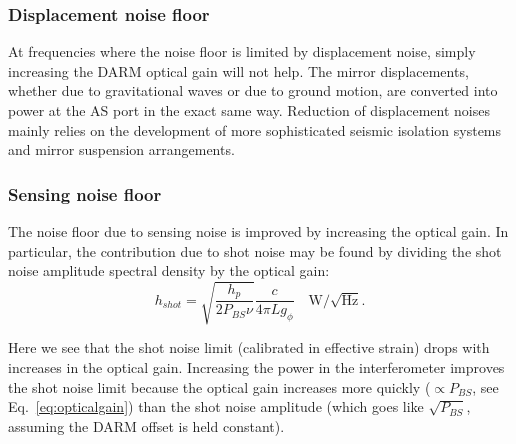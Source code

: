 \subsubsection{Displacement noise floor} 
At frequencies where the noise floor is limited by displacement noise,
simply increasing the DARM optical gain will not help. The mirror
displacements, whether due to gravitational waves or due to ground
motion, are converted into power at the AS port in the exact same
way.   Reduction of displacement noises mainly relies on the development
of more sophisticated seismic isolation systems and mirror suspension
arrangements.


\subsubsection{Sensing noise floor}
The noise floor due to sensing noise is improved by increasing the
optical gain. 
In particular, the contribution due to shot noise  may be found by 
dividing the shot noise amplitude spectral density by the optical gain:
\begin{equation}
h_{shot} = \sqrt{\frac{h_p}{2 P_{BS} \nu}} \frac{c}{4 \pi L g_{\phi}}
\quad \text{W}/\sqrt{\text{Hz}}.
\label{eq:SNL}
\end{equation}

Here we see that the shot noise limit (calibrated in effective strain)
drops with increases in the optical gain.  Increasing the power in the
interferometer improves the shot noise limit because the optical gain
increases more quickly ($\propto P_{BS}$, see
Eq.~\ref{eq:opticalgain}) than the shot noise amplitude (which goes
like $\sqrt{P_{BS}}$, assuming the DARM offset is held constant).




